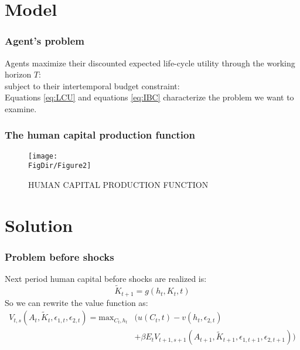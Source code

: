\documentclass{beamer}
\begin{document}
    \section{Model}
    \begin{frame}
      \frametitle{Agent's problem}
      Agents maximize their discounted expected life-cycle utility through the working horizon $T$:
      \begin{equation}
        \label{eq:LCU}
        
      \end{equation}
      subject to their intertemporal budget constraint:
            \begin{equation}
        \label{eq:IBC}
        
      \end{equation}
      Equations \eqref{eq:LCU} and equations \eqref{eq:IBC} characterize the problem we want to examine.
    \end{frame}

    \begin{frame}
      \frametitle{The human capital production function}
      \hypertarget{HCprodfunc}{}
      \begin{figure}[tbp]
        \centerline{\texttt{[image: \\FigDir/Figure2]}}
        \caption{HUMAN CAPITAL PRODUCTION FUNCTION} 
        \label{fig:HCprodfunc}
      \end{figure}
    \end{frame}

      \section{Solution}
      \begin{frame}
        \frametitle{Problem before shocks}
        Next period human capital before shocks are realized is:
        $$   \tilde{K}_{t+1} = g(h_t, K_t,t) $$
        So we can rewrite the value function as:
        \begin{equation*}
          \begin{split}
            V_{t,s}(A_t,\tilde{K}_t,\epsilon_{1,t},\epsilon_{2,t})=\text{max}_{C_t,h_t} & (u(C_t,t)-v(h_t, \epsilon_{2,t}) \\ & + \beta E_t V_{t+1,s+1} (A_{t+1},\tilde{K}_{t+1},\epsilon_{1,t+1},\epsilon_{2,t+1}))
          \end{split}
        \end{equation*}
      \end{frame}
      
\end{document}
